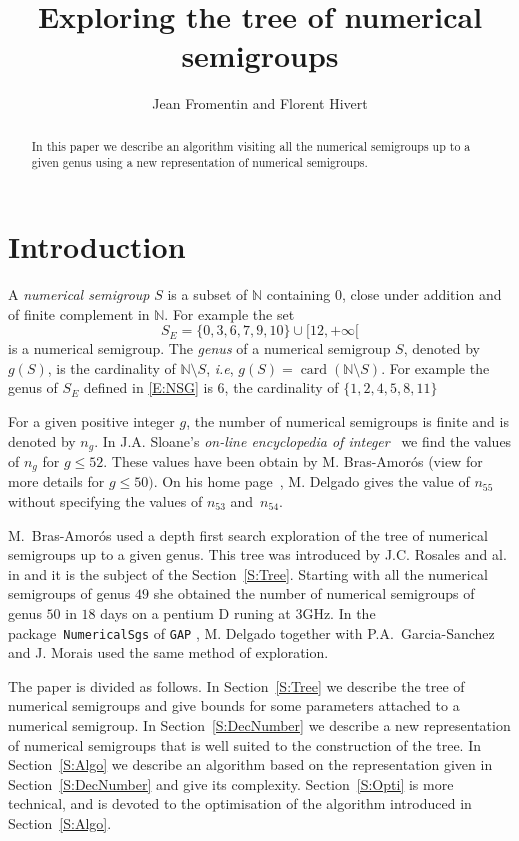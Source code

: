 \documentclass[reqno,11pt]{amsart}
\title{Exploring the tree of numerical semigroups}
\author{Jean Fromentin and  Florent Hivert}
\theoremstyle{plain}
\theoremstyle{definition}
\newcommand{\ie}{\emph{i.e.}}
\renewcommand{\leq}{\leqslant}
\newcommand{\NN}{\mathbb{N}}
\renewcommand{\tt}[1]{\texttt{#1}}
\renewcommand{\ie}{\emph{i.e}}
\DeclareMathOperator{\card}{card}
\begin{document}
\begin{abstract}
In this paper we describe an algorithm visiting all the numerical semigroups up to a given genus using a new representation of numerical semigroups. 
\end{abstract}

\maketitle

\section{Introduction}

A \emph{numerical semigroup} $S$ is a subset of $\NN$ containing $0$, close under addition and of finite complement in $\NN$.  
For example the set 
\begin{equation}
\label{E:NSG}
S_E=\{0,3,6,7,9,10\}\cup[12,+\infty[
\end{equation}
is a numerical semigroup.
The \emph{genus} of a numerical semigroup $S$, denoted by~$g(S)$, is the cardinality of $\NN\setminus S$, \ie, $g(S)=\card(\NN\setminus S)$. 
 For example the genus of $S_E$ defined in \eqref{E:NSG} is $6$,  the cardinality of $\{1,2,4,5,8,11\}$

For a given positive integer $g$, the number of numerical semigroups  is finite and is denoted by $n_g$. 
In  J.A. Sloane's \emph{on-line encyclopedia of integer}~\cite{OEIS} we find the values of $n_g$ for $g\leq 52$. 
These values have been obtain by M. Bras-Amor\'os (view \cite{BrasAmoros2008} for more details for $g\leq 50)$. 
On his home page~\cite{Delgado}, M. Delgado  gives the value of $n_{55}$ without specifying the values of $n_{53}$ and~$n_{54}$. 

M.~Bras-Amor\'os used a depth first search exploration of the tree of numerical semigroups up to a given genus.
This tree was introduced by J.C. Rosales and al. in \cite{Rosales} and it is the subject of the Section~\ref{S:Tree}.
Starting with all the numerical semigroups of genus $49$ she obtained the number of numerical semigroups of genus $50$ in $18$ days on a pentium D runing at $3$GHz. 
In the package~\tt{NumericalSgs} \cite{NumericalSgps} of \tt{GAP} \cite{GAP}, M. Delgado together with P.A.~Garcia-Sanchez and J. Morais used the same method of exploration.

The paper is divided as follows.
In Section~\ref{S:Tree} we describe the tree of numerical semigroups and give bounds for some parameters attached to a numerical semigroup.
In Section~\ref{S:DecNumber} we describe a new representation of numerical semigroups that is well suited to the construction of the tree. 
In Section~\ref{S:Algo} we describe an algorithm based on the representation given in Section~\ref{S:DecNumber} and give its complexity. 
Section~\ref{S:Opti} is more technical, and is devoted to the optimisation of the algorithm introduced in Section~\ref{S:Algo}.
\end{document}
